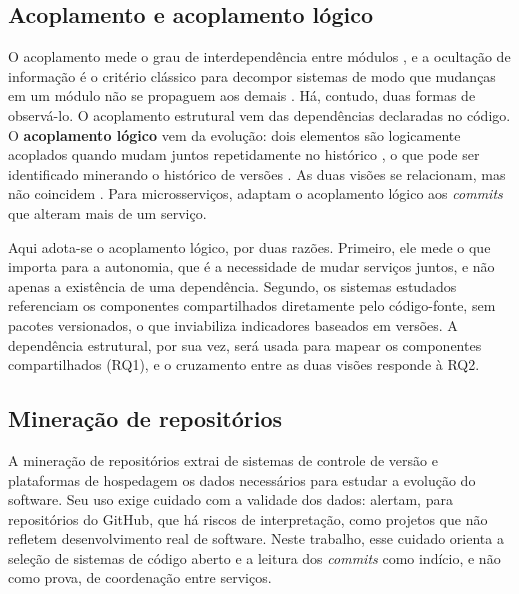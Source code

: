 \subsection{Acoplamento e acoplamento lógico}

O acoplamento mede o grau de interdependência entre módulos \cite{stevens1974}, e a ocultação de informação é o critério clássico para decompor sistemas de modo que mudanças em um módulo não se propaguem aos demais \cite{parnas1972}. Há, contudo, duas formas de observá-lo. O acoplamento estrutural vem das dependências declaradas no código. O \textbf{acoplamento lógico} vem da evolução: dois elementos são logicamente acoplados quando mudam juntos repetidamente no histórico \cite{gall1998}, o que pode ser identificado minerando o histórico de versões \cite{zimmermann2005}. As duas visões se relacionam, mas não coincidem \cite{ajienka2017}. Para microsserviços,  adaptam o acoplamento lógico aos \textit{commits} que alteram mais de um serviço.

Aqui adota-se o acoplamento lógico, por duas razões. Primeiro, ele mede o que importa para a autonomia, que é a necessidade de mudar serviços juntos, e não apenas a existência de uma dependência. Segundo, os sistemas estudados referenciam os componentes compartilhados diretamente pelo código-fonte, sem pacotes versionados, o que inviabiliza indicadores baseados em versões. A dependência estrutural, por sua vez, será usada para mapear os componentes compartilhados (RQ1), e o cruzamento entre as duas visões responde à RQ2.

\subsection{Mineração de repositórios}

A mineração de repositórios extrai de sistemas de controle de versão e plataformas de hospedagem os dados necessários para estudar a evolução do software. Seu uso exige cuidado com a validade dos dados:  alertam, para repositórios do GitHub, que há riscos de interpretação, como projetos que não refletem desenvolvimento real de software. Neste trabalho, esse cuidado orienta a seleção de sistemas de código aberto e a leitura dos \textit{commits} como indício, e não como prova, de coordenação entre serviços.
